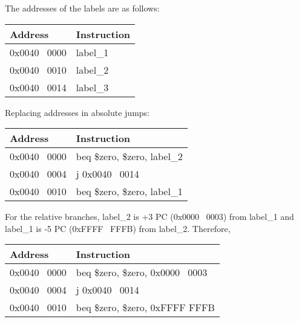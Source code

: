 \documentclass[12pt]{article}
\begin{document}
\begin{enumerate}
    The addresses of the labels are as follows:

    \begin{center}
      \begin{tabular}{ |l|l| } 
        \hline
        \textbf{Address} & \textbf{Instruction} \\
        \hline
          0x0040 \ 0000 & label\_1 \\
          0x0040 \ 0010 & label\_2 \\
          0x0040 \ 0014 & label\_3 \\
        \hline
      \end{tabular}
    \end{center}

    Replacing addresses in absolute jumps:

    \begin{center}
      \begin{tabular}{ |l|l| } 
        \hline
        \textbf{Address} & \textbf{Instruction} \\
        \hline
        0x0040 \ 0000 & beq \$zero, \$zero, label\_2 \\
        \hline
        0x0040 \ 0004 & j 0x0040 \ 0014 \\
        \hline
        0x0040 \ 0010 & beq \$zero, \$zero, label\_1\\
        \hline
      \end{tabular}
    \end{center}

    For the relative branches, label\_2 is +3 PC (0x0000 \ 0003) from label\_1 and label\_1 is -5 PC (0xFFFF \ FFFB) from label\_2.  Therefore,

    \begin{center}
      \begin{tabular}{ |l|l| } 
        \hline
        \textbf{Address} & \textbf{Instruction} \\
        \hline
        0x0040 \ 0000 & beq \$zero, \$zero, 0x0000 \ 0003 \\
        \hline
        0x0040 \ 0004 & j 0x0040 \ 0014 \\
        \hline
        0x0040 \ 0010 & beq \$zero, \$zero, 0xFFFF FFFB \\
        \hline
      \end{tabular}
    \end{center}

    \begin{enumerate}


\end{enumerate}
\end{enumerate}
\end{document}
